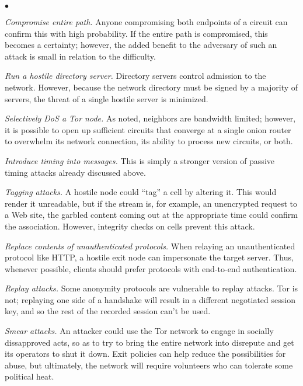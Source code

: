 \documentclass[times,10pt,twocolumn]{article}
\newenvironment{tightlist}{\begin{list}{$\bullet$}{
  \setlength{\itemsep}{0mm}
    \setlength{\parsep}{0mm}
    }}{\end{list}}
\begin{document}
\begin{tightlist}
\item \emph{Compromise entire path.} Anyone compromising both
  endpoints of a circuit can confirm this with high probability. If
  the entire path is compromised, this becomes a certainty; however,
  the added benefit to the adversary of such an attack is small in
  relation to the difficulty.
  
\item \emph{Run a hostile directory server.} Directory servers control
  admission to the network. However, because the network directory
  must be signed by a majority of servers, the threat of a single
  hostile server is minimized.
  
\item \emph{Selectively DoS a Tor node.} As noted, neighbors are
  bandwidth limited; however, it is possible to open up sufficient
  circuits that converge at a single onion router to
  overwhelm its network connection, its ability to process new
  circuits, or both.

\item \emph{Introduce timing into messages.} This is simply a stronger
  version of passive timing attacks already discussed above.
  
\item \emph{Tagging attacks.} A hostile node could ``tag'' a
  cell by altering it. This would render it unreadable, but if the
  stream is, for example, an unencrypted request to a Web site,
  the garbled content coming out at the appropriate time could confirm
  the association. However, integrity checks on cells prevent
  this attack.

\item \emph{Replace contents of unauthenticated protocols.}  When
  relaying an unauthenticated protocol like HTTP, a hostile exit node 
  can impersonate the target server.  Thus, whenever possible, clients
  should prefer protocols with end-to-end authentication.

\item \emph{Replay attacks.} Some anonymity protocols are vulnerable
  to replay attacks.  Tor is not; replaying one side of a handshake
  will result in a different negotiated session key, and so the rest
  of the recorded session can't be used.  

\item \emph{Smear attacks.} An attacker could use the Tor network to
  engage in socially dissapproved acts, so as to try to bring the
  entire network into disrepute and get its operators to shut it down.
  Exit policies can help reduce the possibilities for abuse, but
  ultimately, the network will require volunteers who can tolerate
  some political heat.


\end{tightlist}
\end{document}

